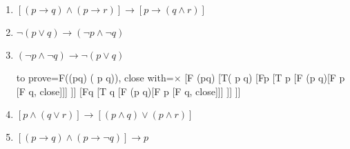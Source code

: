 \begin{problem}
\begin{enumerate}
\ifKey 
\color{red}
\color{black}
\else
{}
\fi

\item $[(p\rightarrow q)\land (p\rightarrow r)]\rightarrow [p\rightarrow (q\land r)]$

\ifKey 
\color{red}
\color{black}
\else
{}
\fi

\item $\neg (p\lor q) \rightarrow (\neg p \land \neg q)$

\ifKey 
\color{red}
\color{black}
\else
{}
\fi
\newpage

\item $(\neg p\land \neg q) \rightarrow \neg( p \lor  q)$


\ifKey 
\color{red}
\begin{tableau}
{
to prove=F((\neg p\land \neg q) \rightarrow \neg( p \lor  q)),
close with=\ensuremath{\times}
}
[F (\neg p\land \neg q)
[T\neg( p \lor  q)
[F\neg p [T p [F (p \lor q)[F p [F q, close]]]  ]]
[F\neg q [T q [F (p \lor q)[F p [F q, close]]]  ]]
]]
\end{tableau}

\color{black}
\else
{}
\fi


\item $[p \land (q\lor r)] \rightarrow [(p \land q) \lor (p \land r)]$

\ifKey 
\color{red}
\color{black}
\else
{}
\fi

\item $[(p \rightarrow q) \land (p \rightarrow \neg q)] \rightarrow  p$


\ifKey 
\color{red}
\color{black}
\else
{}
\fi

%

\end{enumerate}
\end{problem}


